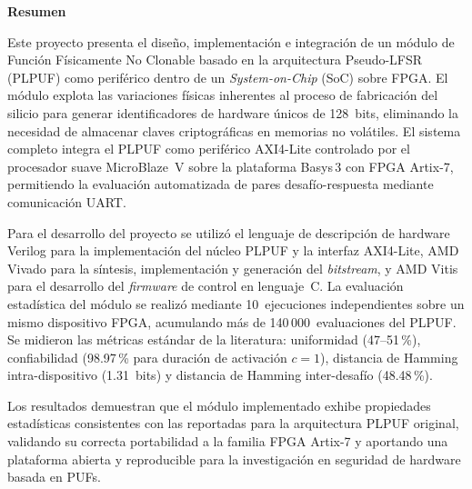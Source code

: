 
\thispagestyle{empty}
\cleardoublepage

\begin{center}
  \vspace*{1.5cm}
  {\Huge\bfseries Resumen}
\end{center}

\vspace{1.5cm}

Este proyecto presenta el diseño, implementación e integración de un módulo
de Función Físicamente No Clonable basado en la arquitectura Pseudo-LFSR
(PLPUF) como periférico dentro de un \textit{System-on-Chip} (SoC) sobre
FPGA. El módulo explota las variaciones físicas inherentes al proceso de
fabricación del silicio para generar identificadores de hardware únicos de
128~bits, eliminando la necesidad de almacenar claves criptográficas en
memorias no volátiles. El sistema completo integra el PLPUF como periférico
AXI4-Lite controlado por el procesador suave MicroBlaze~V sobre la plataforma
Basys\,3 con FPGA Artix-7, permitiendo la evaluación automatizada de pares
desafío-respuesta mediante comunicación UART.

Para el desarrollo del proyecto se utilizó el lenguaje de descripción de
hardware Verilog para la implementación del núcleo PLPUF y la interfaz
AXI4-Lite, AMD Vivado para la síntesis, implementación y generación del
\textit{bitstream}, y AMD Vitis para el desarrollo del \textit{firmware} de
control en lenguaje~C. La evaluación estadística del módulo se realizó
mediante 10~ejecuciones independientes sobre un mismo dispositivo FPGA,
acumulando más de 140\,000~evaluaciones del PLPUF. Se midieron las métricas
estándar de la literatura: uniformidad (47--51\,\%), confiabilidad (98.97\,\%
para duración de activación $c = 1$), distancia de Hamming intra-dispositivo
(1.31~bits) y distancia de Hamming inter-desafío (48.48\,\%).

Los resultados demuestran que el módulo
implementado exhibe propiedades estadísticas consistentes con las reportadas
para la arquitectura PLPUF original, validando su correcta portabilidad a la
familia FPGA Artix-7 y aportando una plataforma abierta y reproducible para
la investigación en seguridad de hardware basada en PUFs.

\vspace{1cm}

